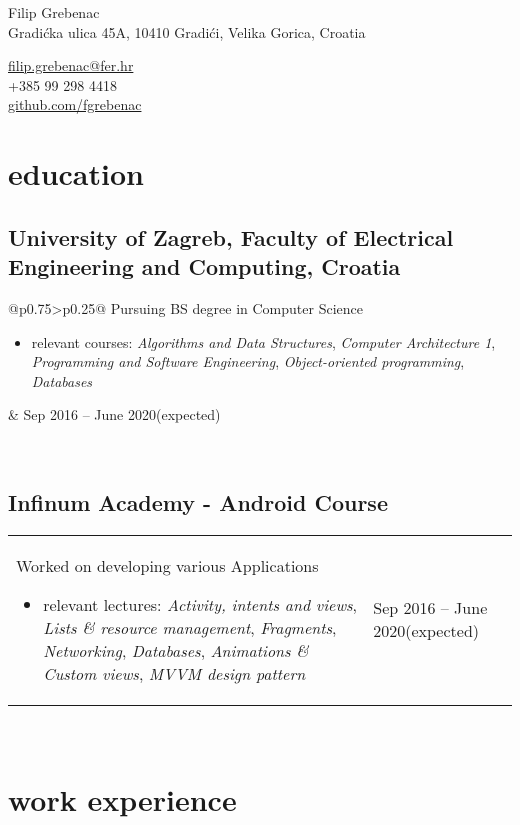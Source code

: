 \documentclass[a4paper]{article}
\makeatletter
\newlength{\tablewidth}
\newenvironment{period}[2]{%
\newcommand{\sarma}{#2}%
\setlength{\tablewidth}{\linewidth}
\addtolength{\tablewidth}{-2\tabcolsep}
\begin{tabular}{@{}p{0.75\tablewidth}>{\raggedleft\arraybackslash}p{0.25\tablewidth}@{}}%
#1 \newline
\begin{itemize}
}{%
\end{itemize} & \sarma \\%
\end{tabular}\\
}
\makeatother
\begin{document}
\fontfamily{\sfdefault}
\selectfont

\begin{minipage}{.5\textwidth}
\LARGE{Filip Grebenac}\\
\normalsize{Gradićka ulica 45A, 10410 Gradići, Velika Gorica, Croatia}
\end{minipage}%
\begin{minipage}{.5\textwidth}
\raggedleft
\href{mailto:ime.prezime@gmail.com}{filip.grebenac@fer.hr} \\
+385 99 298 4418 \\
\href{https://github.com/iprezime}{github.com/fgrebenac}
\end{minipage}

\vspace{1em}


\section{education}
\subsection{University of Zagreb, Faculty of Electrical Engineering and Computing, Croatia}
\begin{period}{Pursuing BS degree in Computer Science}{Sep 2016 -- June 2020\linebreak(expected)}
    \item relevant courses:
        \textit{Algorithms and Data Structures},
        \textit{Computer Architecture 1},
        \textit{Programming and Software Engineering},
        \textit{Object-oriented programming},
        \textit{Databases}
\end{period}

\subsection{Infinum Academy - Android Course}
\begin{period}{Worked on developing various Applications}{Jul 2018 -- Aug 2018}
    \item relevant lectures:
        \textit{Activity, intents and views},
        \textit{Lists \& resource management},
        \textit{Fragments},
        \textit{Networking},
        \textit{Databases},
        \textit{Animations \& Custom views},
        \textit{MVVM design pattern}
\end{period}

\section{work experience}
\end{document}
